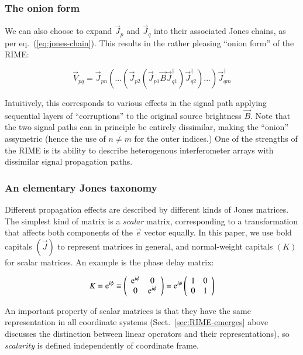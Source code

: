 \documentclass[]{aa}
\begin{document}
\subsubsection{The onion form}

We can also choose to expand $\vec J_p$ and $\vec J_q$ into their associated Jones chains, as per 
eq.~(\ref{eq:jones-chain}). This results in the rather pleasing ``onion form'' of the RIME:

    \begin{equation}\label{eq:me0-onion}
    \vec V_{pq} = \vec J_{pn}(...(\vec J_{p2} (\vec J_{p1} \vec B  \vec J_{q1}^\dagger)\vec J^\dagger_{q2}) ... )\vec J^\dagger_{qm}
    \end{equation}

Intuitively, this corresponds to various effects in the signal path applying sequential layers of ``corruptions'' to the original source brightness $\vec B$. Note that the two signal paths can in principle be entirely dissimilar, making the ``onion'' assymetric (hence the use of $n\ne m$ for the outer indices.) One of the strengths of the RIME is its ability to describe heterogenous interferometer arrays with dissimilar signal propagation paths.

\subsubsection{An elementary Jones taxonomy}

Different propagation effects are described by different kinds of Jones matrices. The simplest kind of matrix is a {\em scalar} matrix, corresponding to a transformation that affects both components of the $\vec e$ vector equally. In this paper, we use bold capitals $(\vec J)$ to represent matrices in general, and normal-weight capitals $(K)$ for scalar matrices. An example is the phase delay matrix:

    \[
    K = {\rm e}^{i\phi} \equiv 
    \left( 
    \begin{array}{cc}
    {\rm e}^{i\phi} & 0 \\
    0 & {\rm e}^{i\phi} \\
    \end{array}
    \right) =   
    {\rm e}^{i\phi} \left( 
    \begin{array}{cc}
    1 & 0 \\
    0 & 1 \\
    \end{array}
    \right)    
    \]

An important property of scalar matrices is that they have the same representation in all coordinate systems (Sect.~\ref{sec:RIME-emerges} above discusses the distinction between linear operators and their representations), so {\em scalarity} is defined independently of coordinate frame.
\end{document}
